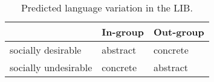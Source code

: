 \begin{table}[t]
    \centering
    \begin{tabular}{lll}
     \toprule
        \textbf{} & \textbf{In-group} & \textbf{Out-group} \\ \midrule
        socially desirable & abstract & concrete \\ \midrule
        socially undesirable & concrete & abstract \\ 
    \bottomrule
    \end{tabular}
    \caption{Predicted language variation in the LIB.}
    \label{tab:lib}
\end{table}

